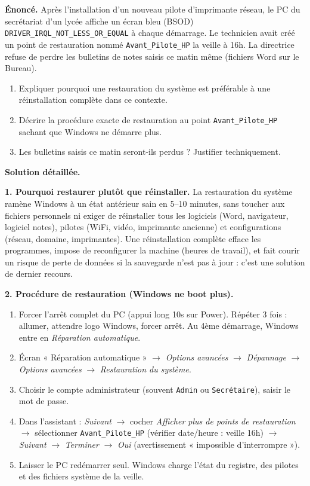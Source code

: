 \documentclass[11pt]{article}
\begin{document}
\begin{exoresolu}
\textbf{Énoncé.} Après l'installation d'un nouveau pilote d'imprimante réseau, le PC du secrétariat d'un lycée affiche un écran bleu (BSOD) \texttt{DRIVER\_IRQL\_NOT\_LESS\_OR\_EQUAL} à chaque démarrage. Le technicien avait créé un point de restauration nommé \texttt{Avant\_Pilote\_HP} la veille à 16h. La directrice refuse de perdre les bulletins de notes saisis ce matin même (fichiers Word sur le Bureau).
\begin{enumerate}
  \item Expliquer pourquoi une restauration du système est préférable à une réinstallation complète dans ce contexte.
  \item Décrire la procédure exacte de restauration au point \texttt{Avant\_Pilote\_HP} sachant que Windows ne démarre plus.
  \item Les bulletins saisis ce matin seront-ils perdus ? Justifier techniquement.
\end{enumerate}
\tcblower
\textbf{Solution détaillée.}

\textbf{1. Pourquoi restaurer plutôt que réinstaller.} La restauration du système ramène Windows à un état antérieur sain en 5--10 minutes, sans toucher aux fichiers personnels ni exiger de réinstaller tous les logiciels (Word, navigateur, logiciel notes), pilotes (WiFi, vidéo, imprimante ancienne) et configurations (réseau, domaine, imprimantes). Une réinstallation complète efface les programmes, impose de reconfigurer la machine (heures de travail), et fait courir un risque de perte de données si la sauvegarde n'est pas à jour : c'est une solution de dernier recours.

\textbf{2. Procédure de restauration (Windows ne boot plus).}
\begin{enumerate}
  \item Forcer l'arrêt complet du PC (appui long 10s sur Power). Répéter 3 fois : allumer, attendre logo Windows, forcer arrêt. Au 4ème démarrage, Windows entre en \emph{Réparation automatique}.
  \item Écran « Réparation automatique » $\rightarrow$ \emph{Options avancées} $\rightarrow$ \emph{Dépannage} $\rightarrow$ \emph{Options avancées} $\rightarrow$ \emph{Restauration du système}.
  \item Choisir le compte administrateur (souvent \texttt{Admin} ou \texttt{Secrétaire}), saisir le mot de passe.
  \item Dans l'assistant : \emph{Suivant} $\rightarrow$ cocher \emph{Afficher plus de points de restauration} $\rightarrow$ sélectionner \texttt{Avant\_Pilote\_HP} (vérifier date/heure : veille 16h) $\rightarrow$ \emph{Suivant} $\rightarrow$ \emph{Terminer} $\rightarrow$ \emph{Oui} (avertissement « impossible d'interrompre »).
  \item Laisser le PC redémarrer seul. Windows charge l'état du registre, des pilotes et des fichiers système de la veille.
\end{enumerate}


\end{exoresolu}
\end{document}
